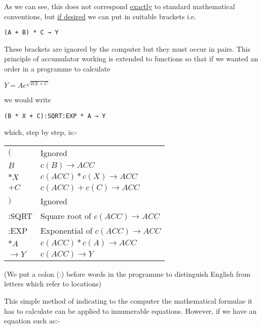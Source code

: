 \documentclass[10pt, a4paper, oneside]{article}
\newcommand{\myuline}[1]{\uline{#1}}
\begin{document}
\begin{multicols}{2}
As we can see, this does not correspond \myuline{exactly} to standard
mathematical conventions, but \myuline{if desired} we can put in
suitable brackets i.e.

\begin{addmargin}[1cm]{1em}%
\begin{lstlisting}
(A + B) * C → Y
\end{lstlisting}
\end{addmargin}

These brackets are ignored by the computer but they
must occur in pairs.  This principle of accumulator
working is extended to functions so that if we wanted
an order in a programme to calculate

\begin{addmargin}[1cm]{1em}%
\begin{math}
Y = Ae^{\sqrt{BX+C}}
\end{math}
\end{addmargin}

we would write

\begin{addmargin}[1cm]{1em}%
\begin{lstlisting}
(B * X + C):SQRT:EXP * A → Y
\end{lstlisting}
\end{addmargin}

which, step by step, is:-

\begin{tabular}{lp{5cm}}
$($   & Ignored \\
$B$   & $c(B) \rightarrow ACC$ \\
$*X$  & $c(ACC) * c(X) \rightarrow ACC$ \\
$+C$  & $c(ACC) + c(C) \rightarrow ACC$ \\
$)$   & Ignored \\
:SQRT & Square root of $c(ACC) \rightarrow ACC$ \\
:EXP  & Exponential of $c(ACC) \rightarrow ACC$ \\
$*A$  & $c(ACC) * c(A) \rightarrow ACC$ \\
$\rightarrow Y$ & $c(ACC) \rightarrow Y$ \\
\end{tabular}

(We put a colon (:) before words in the
programme to distinguish English from letters which
refer to locations)

This simple method of indicating to the
computer the mathematical formulae it has to calculate
can be applied to innumerable equations.  However, if
we have an equation such as:-


\end{multicols}
\end{document}
